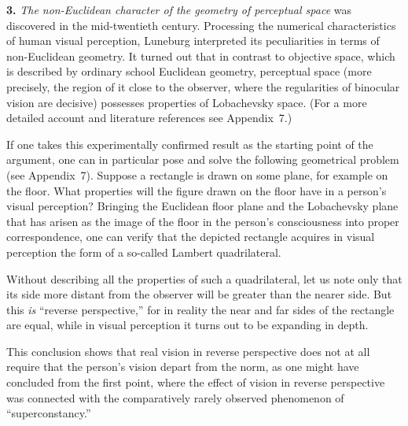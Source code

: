 \medskip
\noindent\textbf{3.}\quad
\emph{The non-Euclidean character of the geometry of perceptual space} was discovered
in the mid-twentieth century.  Processing the numerical characteristics of human
visual perception, Luneburg interpreted its peculiarities in terms of non-Euclidean
geometry.  It turned out that in contrast to objective space, which is described by
ordinary school Euclidean geometry, perceptual space (more precisely, the region of
it close to the observer, where the regularities of binocular vision are decisive)
possesses properties of Lobachevsky space.  (For a more detailed account and
literature references see Appendix~7.)

If one takes this experimentally confirmed result as the starting point of the
argument, one can in particular pose and solve the following geometrical problem (see
Appendix~7).  Suppose a rectangle is drawn on some plane, for example on the floor.
What properties will the figure drawn on the floor have in a person's visual
perception?  Bringing the Euclidean floor plane and the Lobachevsky plane that has
arisen as the image of the floor in the person's consciousness into proper
correspondence, one can verify that the depicted rectangle acquires in visual
perception the form of a so-called Lambert quadrilateral.


Without describing all the properties of such a quadrilateral, let us note only that
its side more distant from the observer will be greater than the nearer side.  But
this \emph{is} ``reverse perspective,'' for in reality the near and far sides of the
rectangle are equal, while in visual perception it turns out to be expanding in
depth.

This conclusion shows that real vision in reverse perspective does not at all require
that the person's vision depart from the norm, as one might have concluded from the
first point, where the effect of vision in reverse perspective was connected with the
comparatively rarely observed phenomenon of ``superconstancy.''


